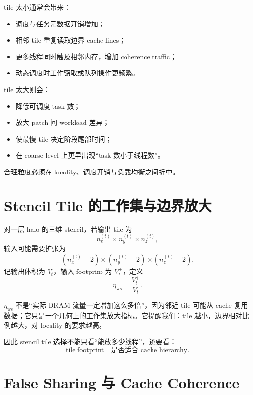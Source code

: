 tile 太小通常会带来：
\begin{itemize}
\item 调度与任务元数据开销增加；
\item 相邻 tile 重复读取边界 cache lines；
\item 更多线程同时触及相邻内存，增加 coherence traffic；
\item 动态调度时工作窃取或队列操作更频繁。
\end{itemize}

tile 太大则会：
\begin{itemize}
\item 降低可调度 task 数；
\item 放大 patch 间 workload 差异；
\item 使最慢 tile 决定阶段尾部时间；
\item 在 coarse level 上更早出现“task 数小于线程数”。
\end{itemize}

合理粒度必须在 locality、调度开销与负载均衡之间折中。

\section{Stencil Tile 的工作集与边界放大}

对一层 halo 的三维 stencil，若输出 tile 为
\begin{equation}
n_x^{(t)}\times n_y^{(t)}\times n_z^{(t)},
\end{equation}
输入可能需要扩张为
\begin{equation}
(n_x^{(t)}+2)
\times
(n_y^{(t)}+2)
\times
(n_z^{(t)}+2).
\end{equation}
记输出体积为 $V_t$，输入 footprint 为 $V_t^+$，定义
\begin{equation}
\eta_{\mathrm{ws}}
=
\frac{V_t^+}{V_t}.
\label{eq:shared-memory-working-set-amplification}
\end{equation}

$\eta_{\mathrm{ws}}$ 不是“实际 DRAM 流量一定增加这么多倍”，因为邻近 tile 可能从 cache 复用数据；它只是一个几何上的工作集放大指标。它提醒我们：tile 越小，边界相对比例越大，对 locality 的要求越高。

因此 stencil tile 选择不能只看“能放多少线程”，还要看：
\begin{equation}
\boxed{
\text{tile footprint}
\quad\text{是否适合 cache hierarchy}.
}
\end{equation}

\section{False Sharing 与 Cache Coherence}


